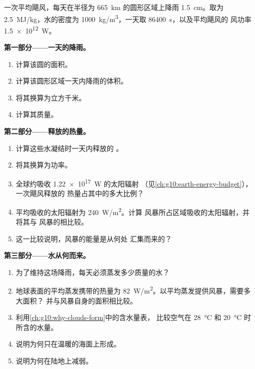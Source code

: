 \begin{problem}
\label{pb:g10:storms-and-cyclones:1}
一次平均飓风，每天在半径为
\qty{665}{km} 的圆形区域上降雨 \qty{1.5}{cm}。取为 \qty{2.5}{MJ/kg}，水的密度为
\qty{1000}{kg/m^3}，一天取 \qty{86400}{s}，以及平均飓风的
风功率 \qty{1.5e12}{W}。

\medskip
\noindent\textbf{第一部分——一天的降雨。}
\begin{enumerate}
  \item 计算该圆的面积。
  \item 计算该圆形区域一天内降雨的体积。
  \item 将其换算为立方千米。
  \item 计算其质量。
\end{enumerate}

\medskip
\noindent\textbf{第二部分——释放的热量。}
\begin{enumerate}[resume]
  \item 计算这些水凝结时一天内释放的
        。
  \item 将其换算为功率。
  \item 全球约吸收 \qty{1.22e17}{W} 的太阳辐射
        （见\cref{ch:g10:earth-energy-budget}），一次飓风释放的
        热量占其中的多大比例？
  \item 平均吸收的太阳辐射为 \qty{240}{W/m^2}。计算
        风暴所占区域吸收的太阳辐射，并将其与
        风暴的相比较。
  \item 这一比较说明，风暴的能量是从何处
        汇集而来的？
\end{enumerate}

\medskip
\noindent\textbf{第三部分——水从何而来。}
\begin{enumerate}[resume]
  \item 为了维持这场降雨，每天必须蒸发多少质量的水？
  \item 地球表面的平均蒸发携带的热量为
        \qty{82}{W/m^2}。以平均蒸发提供风暴，需要多大面积？
        并与风暴自身的面积相比较。
  \item 利用\cref{ch:g10:why-clouds-form}中的含水量表，
        比较空气在 \qty{28}{\degreeCelsius} 和
        \qty{20}{\degreeCelsius} 时所含的水量。
  \item 说明为何只在温暖的海面上形成。
  \item 说明为何在陆地上减弱。
\end{enumerate}


\end{problem}
